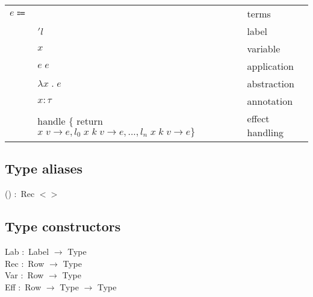 \documentclass[12pt]{article}
\newcommand\eapp[2]{#1 \; #2}
\newcommand\eabs[2]{\lambda #1 \; . \; #2}
\newcommand\eanno[2]{#1 : #2}
\begin{document}
\vspace{15pt}\noindent
\begin{tabular}{l l l}
	$e \Coloneqq$ & & terms \\
		& $'l$ & label \\
		& $x$ & variable \\
		& $\eapp{e}{e}$ & application \\
		& $\eabs{x}{e}$ & abstraction \\
		& $\eanno{x}{\tau}$ & annotation \\

		& handle $\{$ return $x \; v \rightarrow e, l_0 \; x \; k \; v \rightarrow e, ..., l_n \; x \; k \; v \rightarrow e \}$ & effect handling \\
\end{tabular}

\subsection{Type aliases}
() $:$ Rec $<>$ \\

\subsection{Type constructors}
Lab $:$ Label $\rightarrow$ Type \\
Rec $:$ Row $\rightarrow$ Type \\
Var $:$ Row $\rightarrow$ Type \\
Eff $:$ Row $\rightarrow$ Type $\rightarrow$ Type \\
\end{document}

